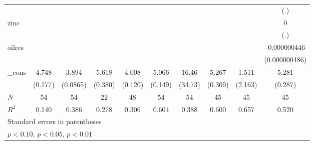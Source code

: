 {\begin{tabular}{l*{9}{c}}
            &                     &                     &                     &                     &                     &                     &                     &                     &         (.)         \\
[1em]
zinc        &                     &                     &                     &                     &                     &                     &                     &                     &           0         \\
            &                     &                     &                     &                     &                     &                     &                     &                     &         (.)         \\
[1em]
oilres      &                     &                     &                     &                     &                     &                     &                     &                     &-0.000000446         \\
            &                     &                     &                     &                     &                     &                     &                     &                     &(0.000000486)         \\
[1em]
\_cons      &       4.748\sym{***}&       3.894\sym{***}&       5.618\sym{***}&       4.008\sym{***}&       5.066\sym{***}&       16.46         &       5.267\sym{***}&       1.511         &       5.281\sym{***}\\
            &     (0.177)         &    (0.0865)         &     (0.380)         &     (0.120)         &     (0.149)         &     (34.73)         &     (0.309)         &     (2.163)         &     (0.287)         \\
\hline
\(N\)       &          54         &          54         &          22         &          48         &          54         &          54         &          45         &          45         &          45         \\
\(R^{2}\)   &       0.140         &       0.386         &       0.278         &       0.306         &       0.604         &       0.388         &       0.600         &       0.657         &       0.520         \\
\hline\hline
\multicolumn{10}{l}{\footnotesize Standard errors in parentheses}\\
\multicolumn{10}{l}{\footnotesize \sym{*} \(p<0.10\), \sym{**} \(p<0.05\), \sym{***} \(p<0.01\)}\\
\end{tabular}
}
